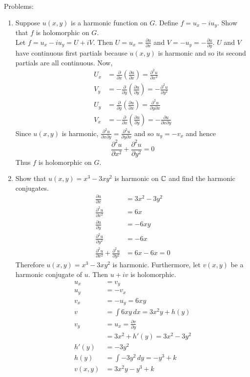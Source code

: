 \documentclass[12pt]{article}
\begin{document}
Problems: \begin{enumerate} 
\item Suppose $u(x,y)$ is a harmonic function on $G$. Define $f = u_x - iu_y$. Show that $f$ is holomorphic on $G$. \\
Let $f = u_x - iu_y = U + iV$. Then $U = u_x = \frac{\partial u }{\partial x}$ and $V = -u_y = -\frac{\partial u}{\partial y}$. $U$ and $V$ have continuous first partials because $u(x,y)$ is harmonic and so its second partials are all continuous. Now,
$$ \begin{aligned} U_x &= \frac{\partial}{\partial x} (\frac{\partial u}{\partial x}) = \frac{\partial^2 u}{\partial x^2} \\ V_y &= -\frac{\partial}{\partial y} (\frac{\partial u}{\partial y}) = -\frac{\partial^2 u}{\partial y^2} \\ U_y &= \frac{\partial}{\partial y} (\frac{\partial u}{\partial x}) = \frac{\partial^2 u}{\partial y \partial x} \\ V_x &= -\frac{\partial}{\partial x}(\frac{\partial u}{\partial y}) = -\frac{\partial u}{\partial x \partial y} \end{aligned} $$ Since $u(x,y)$ is harmonic, $\frac{\partial^2 u}{\partial x \partial y} = \frac{\partial^2 u}{\partial y \partial x}$ and so $u_y = -v_x$ and hence 
$$ \frac{\partial^2 u}{\partial x^2} + \frac{\partial^2 u}{\partial y^2} = 0 $$ 
Thus $f$ is holomorphic on $G$. 
\item Show that $u(x,y) = x^3 - 3xy^2$ is harmonic on $\mathbb{C}$ and find the harmonic conjugates. \\
$$ \begin{aligned} \frac{\partial u}{\partial x} &= 3x^2 - 3y^2 \\ \frac{\partial^2 u}{\partial x^2} &= 6x \\ \frac{\partial u}{\partial y} &= -6xy \\ \frac{\partial^2 u}{\partial y^2} &= -6x \\ \frac{\partial^2 u}{\partial x^2} + \frac{\partial^2 u}{\partial y^2} &= 6x - 6x = 0 \end{aligned} $$ Therefore $u(x,y) = x^3 - 3xy^2$ is harmonic. Furthermore, let $v(x,y)$ be a harmonic conjugate of $u$. Then $u+iv$ is holomorphic. $$ \begin{aligned} u_x &= v_y \\ u_y &= -v_x \\ v_x &= -u_y = 6xy \\ v &= \int 6xy \, dx = 3x^2y + h(y) \\ v_y &= u_x = \frac{\partial v}{\partial y} \\ &= 3x^2 + h'(y) = 3x^2 - 3y^2 \\ h'(y) &= -3y^2 \\ h(y) &= \int -3y^2 \, dy = -y^3 + k \\ v(x,y) &= 3x^2y - y^3 + k \end{aligned} $$ 

\end{enumerate}
\end{document}
